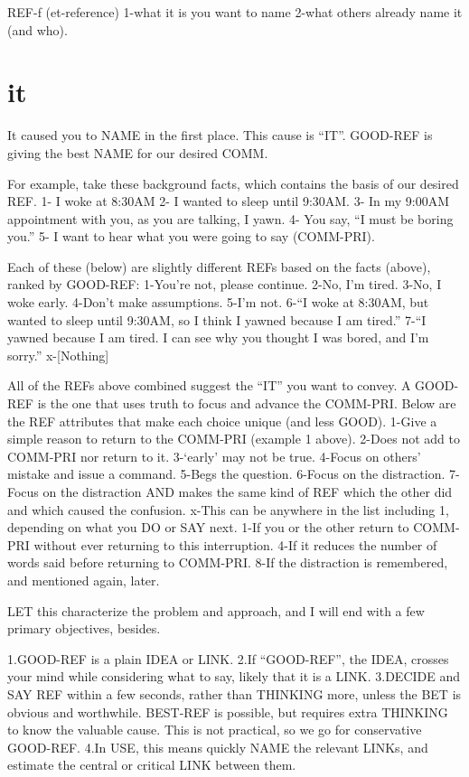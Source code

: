 \documentclass[
]{book}
\begin{document}
REF-f
(et-reference)
1-what it is you want to name
2-what others already name it (and who).

\hypertarget{it}{%
\section{it}\label{it}}

It caused you to NAME in the first place.
This cause is ``IT''.
GOOD-REF is giving the best NAME for our desired COMM.

For example, take these background facts, which contains the basis of our desired REF.
1- I woke at 8:30AM
2- I wanted to sleep until 9:30AM.
3- In my 9:00AM appointment with you, as you are talking, I yawn.
4- You say, ``I must be boring you.''
5- I want to hear what you were going to say (COMM-PRI).

Each of these (below) are slightly different REFs based on the facts (above), ranked by GOOD-REF:
1-You're not, please continue.
2-No, I'm tired.
3-No, I woke early.
4-Don't make assumptions.
5-I'm not.
6-``I woke at 8:30AM, but wanted to sleep until 9:30AM, so I think I yawned because I am tired.''
7-``I yawned because I am tired. I can see why you thought I was bored, and I'm sorry.''
x-{[}Nothing{]}

All of the REFs above combined suggest the ``IT'' you want to convey. A GOOD-REF is the one that uses truth to focus and advance the COMM-PRI. Below are the REF attributes that make each choice unique (and less GOOD).
1-Give a simple reason to return to the COMM-PRI (example 1 above).
2-Does not add to COMM-PRI nor return to it.
3-`early' may not be true.
4-Focus on others' mistake and issue a command.
5-Begs the question.
6-Focus on the distraction.
7-Focus on the distraction AND makes the same kind of REF which the other did and which caused the confusion.
x-This can be anywhere in the list including 1, depending on what you DO or SAY next.
1-If you or the other return to COMM-PRI without ever returning to this interruption.
4-If it reduces the number of words said before returning to COMM-PRI.
8-If the distraction is remembered, and mentioned again, later.

LET this characterize the problem and approach, and I will end with a few primary objectives, besides.

1.GOOD-REF is a plain IDEA or LINK.
2.If ``GOOD-REF'', the IDEA, crosses your mind while considering what to say, likely that it is a LINK.
3.DECIDE and SAY REF within a few seconds, rather than THINKING more, unless the BET is obvious and worthwhile. BEST-REF is possible, but requires extra THINKING to know the valuable cause. This is not practical, so we go for conservative GOOD-REF.
4.In USE, this means quickly NAME the relevant LINKs, and estimate the central or critical LINK between them.
\end{document}
